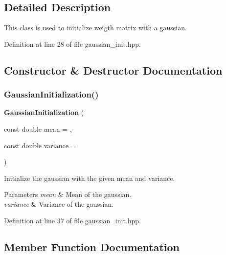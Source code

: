 \subsection{Detailed Description}
This class is used to initialize weigth matrix with a gaussian. 

Definition at line 28 of file gaussian\+\_\+init.\+hpp.



\subsection{Constructor \& Destructor Documentation}
\mbox{\label{classmlpack_1_1ann_1_1GaussianInitialization_a24cf98fa7ddd2bb1b828c41bd0caa7de}} 
\subsubsection{Gaussian\+Initialization()}
{\footnotesize\ttfamily \textbf{ Gaussian\+Initialization} (\begin{DoxyParamCaption}\item[{const double}]{mean = {},  }\item[{const double}]{variance = {} }\end{DoxyParamCaption})\hspace{0.3cm}{\ttfamily [inline]}}



Initialize the gaussian with the given mean and variance. 


\begin{DoxyParams}{Parameters}
{\em mean} & Mean of the gaussian. \\
\hline
{\em variance} & Variance of the gaussian. \\
\hline
\end{DoxyParams}


Definition at line 37 of file gaussian\+\_\+init.\+hpp.



\subsection{Member Function Documentation}
\mbox{\label{classmlpack_1_1ann_1_1GaussianInitialization_a5cfe472251a41fffd45b170bb0d3c1bd}} 
